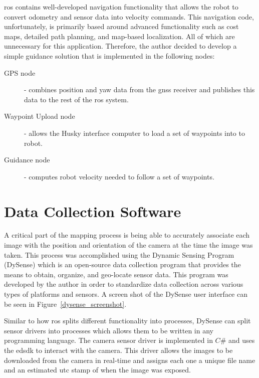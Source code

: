 \ac{ros} contains well-developed navigation functionality that allows the robot to convert odometry and sensor data into velocity commands.  This navigation code, unfortunately, is primarily based around advanced functionality such as cost maps, detailed path planning, and map-based localization. All of which are unnecessary for this application.  Therefore, the author decided to develop a simple guidance solution that is implemented in the following nodes:

\begin{description}
\item[GPS node] - combines position and yaw data from the \ac{gnss} receiver and publishes this data to the rest of the \ac{ros} system.
\item[Waypoint Upload node] - allows the Husky interface computer to load a set of waypoints into to robot.
\item[Guidance node] - computes robot velocity needed to follow a set of waypoints. 
\end{description}

\section{Data Collection Software}
\label{system-software}

A critical part of the mapping process is being able to accurately associate each image with the position and orientation of the camera at the time the image was taken.  This process was accomplished using the Dynamic Sensing Program (DySense) which is an open-source data collection program that provides the means to obtain, organize, and geo-locate sensor data.  This program was developed by the author in order to standardize data collection across various types of platforms and sensors.  A screen shot of the DySense user interface can be seen in Figure~\ref{dysense_screenshot}.

Similar to how \ac{ros} splits different functionality into processes, DySense can split sensor drivers into processes which allows them to be written in any programming language.  The camera sensor driver is implemented in $C\#$ and uses the \ac{edsdk} to interact with the camera.  This driver allows the images to be downloaded from the camera in real-time and assigns each one a unique file name and an estimated \ac{utc} stamp of when the image was exposed.

